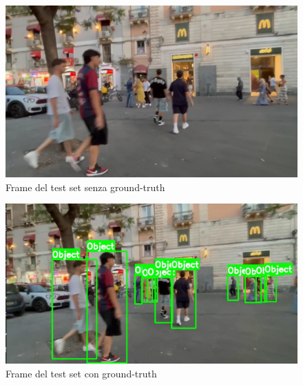 \documentclass[12pt]{article}
\begin{document}
\begin{figure}[H]
    \centering
    \includegraphics[width=1.00\textwidth]{./img/test-without-ground-truth.png}
    \caption{Frame del test set senza ground-truth}
    \label{fig:roboflow-test-set-no-gt}
\end{figure}

\begin{figure}[H]
    \centering
    \includegraphics[width=1.00\textwidth]{./img/ground-truth-test.png}
    \caption{Frame del test set con ground-truth}
    \label{fig:roboflow-test-set-with-gt}
\end{figure}
\end{document}
